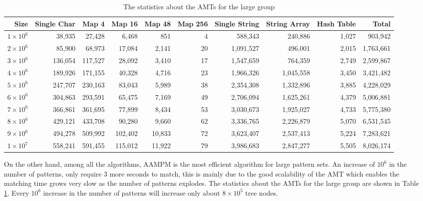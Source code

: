 \documentclass{article}
\begin{document}
\begin{table}[!htp]
  \caption{The statistics about the AMTs for the large group}
  \scriptsize
  \label{tab:large_group}
  \begin{tabular}{rrrrrrrrrr}
 \hline
 Size &
 Single Char &
 Map 4 &
 Map 16 &
 Map 48 &
 Map 256 &
 Single String &
 String Array   &
 Hash Table &
 Total\\
\hline
$1 \times 10^6$ &  38,935 &   27,428  &   6,468 &     851   &	 4 &    588,343	 &    240,886 &  1,027 &    903,942  \\
$2 \times 10^6$ &  85,900 &   68,973  &  17,084 &   2,141   &	20 &  1,091,527	 &    496,001 &  2,015 &  1,763,661  \\
$3 \times 10^6$ & 136,054 &  117,527  &  28,092 &   3,410   &	17 &  1,547,659	 &    764,359 &  2,749 &  2,599,867  \\
$4 \times 10^6$ & 189,926 &  171,155  &  40,328 &   4,716   &	23 &  1,966,326	 &  1,045,558 &  3,450 &  3,421,482  \\
$5 \times 10^6$ & 247,707 &  230,163  &  83,043 &   5,989   &  38 &  2,354,308	 &  1,332,896 &  3,885 &  4,228,029  \\
$6 \times 10^6$ & 304,863 &  293,591  &  65,475 &   7,169   &	49 &  2,706,094	 &  1,625,261 &  4,379 &  5,006,881  \\
$7 \times 10^6$ & 366,861 &  361,695  &  77,899 &   8,434   &	53 &  3,030,673	 &  1,925,027 &  4,733 &  5,775,380  \\
$8 \times 10^6$ & 429,121 &  433,708  &  90,280 &   9,660   &	62 &  3,336,765	 &  2,226,879 &  5,070 &  6,531,545  \\
$9 \times 10^6$ & 494,278 &  509,992  & 102,402 &  10,833   &	72 &  3,623,407	 &  2,537,413 &  5,224 &  7,283,621  \\
$1 \times 10^7$ & 558,241 &  591,455  & 115,012 &  11,922   &	79 &  3,986,683	 &  2,847,277 &  5,505 &  8,026,174  \\
\hline
\end{tabular}
\end{table}

On the other hand, among all the algorithms, \textsf{AAMPM} is the
most efficient algorithm for large pattern sets. An increase of $10^6$
in the number of patterns, only require 3 more seconds to match, this
is mainly due to the good scalability of the AMT which enables the
matching time grows very slow as the number of patterns explodes. The
statistics about the AMTs for the large group are shown in Table
\ref{tab:large_group}. Every $10^6$ increase in the number of patterns
will increase only about $8 \times 10^5$ tree nodes.
\end{document}
